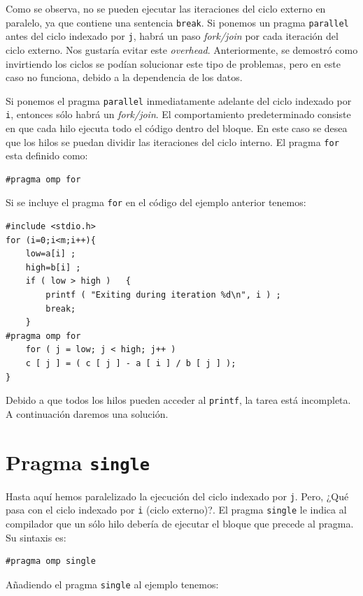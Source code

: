 \documentclass[12pt,letterpaper]{book}
\begin{document}
Como se observa, no se pueden ejecutar las iteraciones del ciclo externo en paralelo, ya que contiene una sentencia \texttt{break}. Si ponemos un pragma \texttt{parallel} antes del ciclo indexado por \texttt{j}, habrá un paso \textit{fork/join} por cada iteración del ciclo externo. Nos gustaría evitar este \textit{overhead}. Anteriormente, se demostró como invirtiendo los ciclos se podían solucionar este tipo de problemas, pero en este caso no funciona, debido a la dependencia de los datos.

Si ponemos el pragma \texttt{parallel} inmediatamente adelante del ciclo indexado por \texttt{i}, entonces sólo habrá un \textit{fork/join}. El comportamiento predeterminado consiste en que cada hilo ejecuta todo el código dentro del bloque. En este caso se desea que los hilos se puedan dividir las iteraciones del ciclo interno. El pragma \texttt{for} esta definido como:

\begin{lstlisting}[style=C]
#pragma omp for
\end{lstlisting}

Si se incluye el pragma \texttt{for} en el código del ejemplo anterior tenemos:

\begin{lstlisting}[style=C]
#include <stdio.h>
for (i=0;i<m;i++){
	low=a[i] ;
	high=b[i] ;
	if ( low > high )	{	
		printf ( "Exiting during iteration %d\n", i ) ;
		break;
	}
#pragma omp for
	for ( j = low; j < high; j++ )
	c [ j ] = ( c [ j ] - a [ i ] / b [ j ] );
}
\end{lstlisting}

Debido a que todos los hilos pueden acceder al \texttt{printf}, la tarea está incompleta. A continuación daremos una solución.


\section{Pragma \texttt{single}}

Hasta aquí hemos paralelizado la ejecución del ciclo indexado por \texttt{j}. Pero, ¿Qué pasa con el ciclo indexado por \texttt{i} (ciclo externo)?. El pragma \texttt{single} le indica al compilador que un sólo hilo debería de ejecutar el bloque que precede al pragma. Su sintaxis es:

\begin{lstlisting}[style=C]
#pragma omp single
\end{lstlisting}

Añadiendo el pragma \texttt{single} al ejemplo tenemos:
\end{document}

